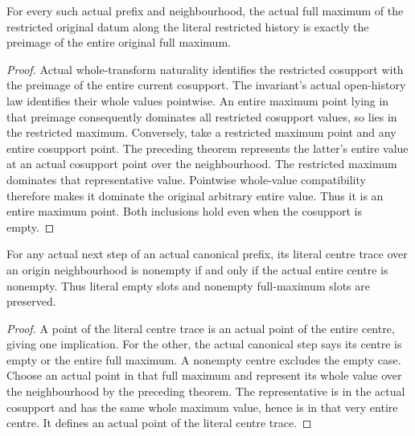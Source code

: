 \begin{theorem}
\label{hir:homogeneous-origin-neighbourhood-whole-maximum-preimage}
For every such actual prefix and neighbourhood, the actual full maximum
of the restricted original datum along the literal restricted history
is exactly the preimage of the entire original full maximum.
\leanok
{}
\end{theorem}
\begin{proof}
Actual whole-transform naturality identifies the restricted cosupport
with the preimage of the entire current cosupport. The invariant's
actual open-history law identifies their whole values pointwise.
An entire maximum point lying in that preimage consequently dominates
all restricted cosupport values, so lies in the restricted maximum.
Conversely, take a restricted maximum point and any entire cosupport
point. The preceding theorem represents the latter's entire value at
an actual cosupport point over the neighbourhood. The restricted
maximum dominates that representative value. Pointwise whole-value
compatibility therefore makes it dominate the original arbitrary
entire value. Thus it is an entire maximum point. Both inclusions
hold even when the cosupport is empty.
\end{proof}

\begin{lemma}
\label{hir:homogeneous-origin-neighbourhood-exact-empty-centre-slots}
For any actual next step of an actual canonical prefix, its literal
centre trace over an origin neighbourhood is nonempty if and only if
the actual entire centre is nonempty. Thus literal empty slots and
nonempty full-maximum slots are preserved.
\leanok
{}
\end{lemma}
\begin{proof}
A point of the literal centre trace is an actual point of the entire
centre, giving one implication. For the other, the actual canonical
step says its centre is empty or the entire full maximum. A nonempty
centre excludes the empty case. Choose an actual point in that full
maximum and represent its whole value over the neighbourhood by the
preceding theorem. The representative is in the actual cosupport and
has the same whole maximum value, hence is in that very entire
centre. It defines an actual point of the literal centre trace.
\end{proof}

